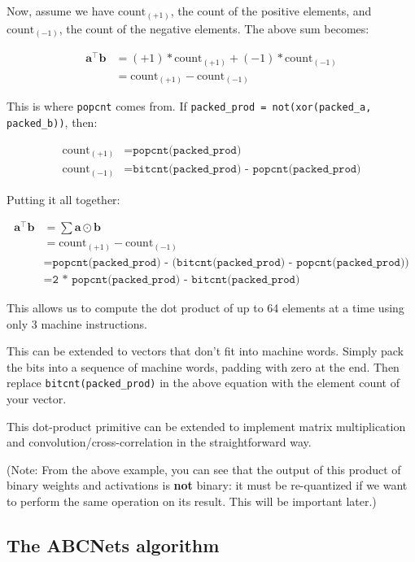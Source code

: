 \documentclass[12pt]{article}
\newcommand{\av}[0]{\mathbf{a}}
\newcommand{\bv}[0]{\mathbf{b}}
\newcommand{\transpose}[1]{#1 ^\top}
\newcommand{\dotp}[2]{\transpose{#1} #2}
\newcommand{\hadamard}[0]{\odot}
\begin{document}
Now, assume we have \(\mathrm{count}_{(+1)}\), the count of the positive elements, and \(\mathrm{count}_{(-1)}\), the count of the negative elements. The above sum becomes:

\begin{align*}
\dotp{\av}{\bv} &= (+1) * \mathrm{count}_{(+1)} + (-1) *
   \mathrm{count}_{(-1)} \\
&= \mathrm{count}_{(+1)} -
   \mathrm{count}_{(-1)}
\end{align*}

This is where \texttt{popcnt} comes from. If
\texttt{packed\_prod = not(xor(packed\_a, packed\_b))}, then:

\begin{align*}
\mathrm{count}_{(+1)} &= \texttt{popcnt(packed\_prod)} \\
\mathrm{count}_{(-1)} &= \texttt{bitcnt(packed\_prod) - popcnt(packed\_prod)}
\end{align*}

Putting it all together:

\begin{align*}
\dotp{\av}{\bv} &= \sum \av \hadamard \bv \\
                &= \mathrm{count}_{(+1)} - \mathrm{count}_{(-1)} \\
                &= \texttt{popcnt(packed\_prod) -
                   (bitcnt(packed\_prod) - popcnt(packed\_prod))} \\
                &= \texttt{2 * popcnt(packed\_prod) - bitcnt(packed\_prod)}
\end{align*}

This allows us to compute the dot product of up to 64 elements at a time using only 3 machine instructions.

This can be extended to vectors that don't fit into machine words. Simply pack the bits into a sequence of machine words, padding with zero at the end. Then replace \texttt{bitcnt(packed\_prod)} in the above equation with the element count of your vector.

This dot-product primitive can be extended to implement matrix multiplication and convolution/cross-correlation in the straightforward way.

(Note: From the above example, you can see that the output of this product of binary weights and activations is \textbf{not} binary: it must be re-quantized if we want to perform the same operation on its result. This will be important later.)

\subsection{The ABCNets algorithm}
\label{sec:org8c7f7d9}
\end{document}
